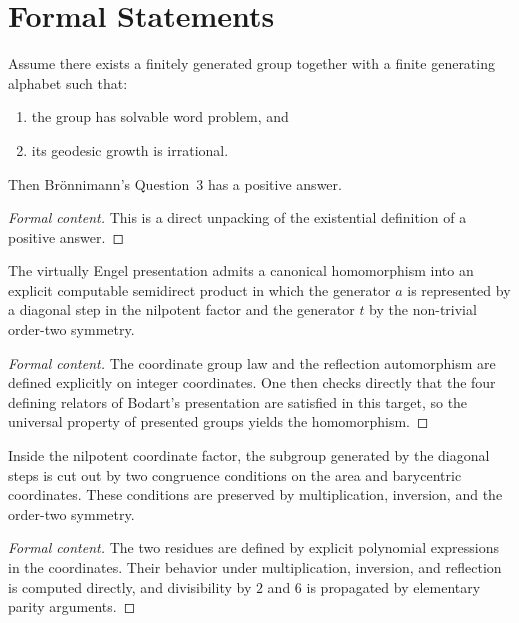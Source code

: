 \section{Formal Statements}
\label{sec:Formalization}

\begin{theorem}
Assume there exists a finitely generated group together with a finite generating alphabet such
that:
\begin{enumerate}[label=(\roman*)]
  \item the group has solvable word problem, and
  \item its geodesic growth is irrational.
\end{enumerate}
Then Br\"onnimann's Question~3 has a positive answer.
\end{theorem}

\begin{proof}[Formal content]
This is a direct unpacking of the existential definition of a positive answer.
\end{proof}

\begin{proposition}
The virtually Engel presentation admits a canonical homomorphism into an explicit computable
semidirect product in which the generator $a$ is represented by a diagonal step in the nilpotent
factor and the generator $t$ by the non-trivial order-two symmetry.
\end{proposition}

\begin{proof}[Formal content]
The coordinate group law and the reflection automorphism are defined explicitly on integer
coordinates. One then checks directly that the four defining relators of Bodart's presentation are
satisfied in this target, so the universal property of presented groups yields the homomorphism.
\end{proof}

\begin{proposition}
Inside the nilpotent coordinate factor, the subgroup generated by the diagonal steps is cut out by
two congruence conditions on the area and barycentric coordinates. These conditions are preserved
by multiplication, inversion, and the order-two symmetry.
\end{proposition}

\begin{proof}[Formal content]
The two residues are defined by explicit polynomial expressions in the coordinates. Their behavior
under multiplication, inversion, and reflection is computed directly, and divisibility by $2$ and
$6$ is propagated by elementary parity arguments.
\end{proof}

